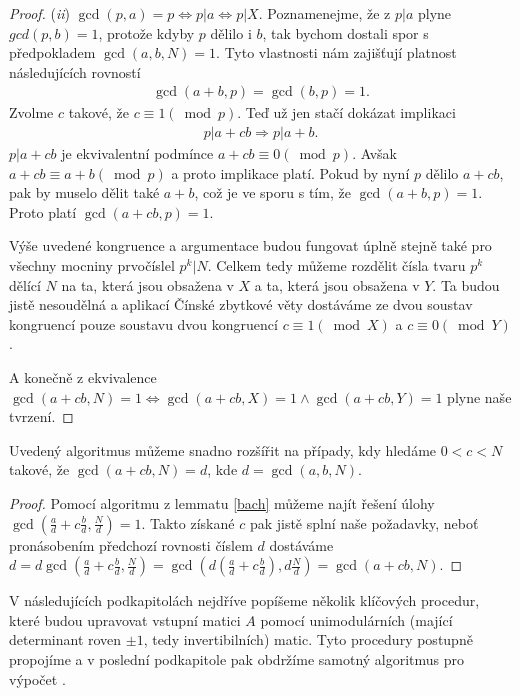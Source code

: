 \begin{proof}
(\textit{ii}) $ \gcd(p,a) = p \Leftrightarrow p \vert a \Leftrightarrow p | X $.
Poznamenejme, že z $ p \vert a $ plyne $ gcd(p, b) = 1 $, protože kdyby $ p $
dělilo i $ b $, tak bychom dostali spor s předpokladem $ \gcd(a,b,N) = 1 $. Tyto
vlastnosti nám zajišťují platnost následujících rovností
\begin{align*}
    \gcd(a + b,p) = \gcd(b, p) = 1.
\end{align*}
Zvolme $ c $ takové, že $ c \equiv 1 (\bmod p) $.
Teď už jen stačí dokázat implikaci
\begin{align*}
    p \vert a + cb \Rightarrow p \vert a + b.
\end{align*}
$ p \vert a + cb $ je ekvivalentní podmínce
$ a + cb \equiv 0 (\bmod p)$. Avšak
$ a + cb \equiv a + b (\bmod p)$ a proto implikace platí.
Pokud by nyní $ p $ dělilo $  a + cb $, pak by muselo dělit také $ a + b $,
což je ve sporu s tím, že $ \gcd(a + b,p) = 1 $. Proto platí
$ \gcd(a + cb,p) = 1 $.

Výše uvedené kongruence a argumentace budou fungovat úplně stejně také pro všechny
mocniny prvočíslel $ p^k \vert N $.
Celkem tedy můžeme rozdělit čísla tvaru $ p^k $ dělící $ N $ na ta, která jsou obsažena v
$ X $ a ta, která jsou obsažena v $ Y $. Ta budou jistě nesoudělná a aplikací
Čínské zbytkové věty dostáváme ze dvou soustav kongruencí pouze soustavu dvou
kongruencí $ c \equiv 1 (\bmod X) $ a $ c \equiv 0 (\bmod Y) $.

A konečně z ekvivalence
$ \gcd(a + cb,N) = 1 \iff \gcd(a + cb,X) = 1 \wedge \gcd(a + cb,Y) = 1 $
plyne naše tvrzení.
\end{proof}
\begin{dus}\label{Bach_Dus}
Uvedený algoritmus můžeme snadno rozšířit na případy, kdy hledáme $ 0 < c < N $
takové, že $ \gcd(a + cb,N) = d $, kde $ d = \gcd(a,b,N) $.
\end{dus}
\begin{proof}
Pomocí algoritmu z lemmatu \ref{bach} můžeme najít řešení úlohy
$ \gcd(\frac{a}{d} + c\frac{b}{d},\frac{N}{d}) = 1 $. Takto získané $ c $ pak
jistě splní naše požadavky, neboť pronásobením předchozí rovnosti číslem $ d $
dostáváme $ d = d \gcd(\frac{a}{d} + c\frac{b}{d},\frac{N}{d}) =
\gcd(d(\frac{a}{d} + c\frac{b}{d}),d\frac{N}{d}) = \gcd(a + cb,N) $.
\end{proof}

V následujících podkapitolách nejdříve popíšeme několik klíčových procedur, které
budou upravovat vstupní matici $ A $ pomocí unimodulárních (mající determinant
roven $\pm 1$, tedy invertibilních) matic.
Tyto procedury postupně propojíme a v poslední podkapitole pak obdržíme samotný
algoritmus pro výpočet \rst.





